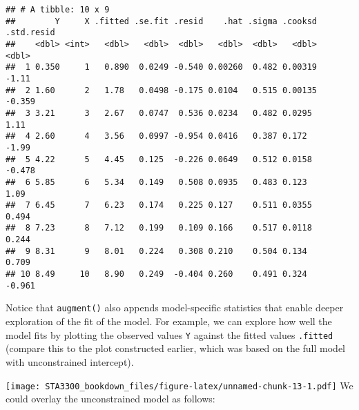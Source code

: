 \documentclass[
]{book}
\newenvironment{Shaded}{\begin{snugshade}}{\end{snugshade}}
\newcommand{\DataTypeTok}[1]{\textcolor[rgb]{0.13,0.29,0.53}{#1}}
\newcommand{\FloatTok}[1]{\textcolor[rgb]{0.00,0.00,0.81}{#1}}
\newcommand{\KeywordTok}[1]{\textcolor[rgb]{0.13,0.29,0.53}{\textbf{#1}}}
\newcommand{\NormalTok}[1]{#1}
\newcommand{\OperatorTok}[1]{\textcolor[rgb]{0.81,0.36,0.00}{\textbf{#1}}}
\newcommand{\StringTok}[1]{\textcolor[rgb]{0.31,0.60,0.02}{#1}}
\begin{document}
\begin{verbatim}
## # A tibble: 10 x 9
##        Y     X .fitted .se.fit .resid    .hat .sigma .cooksd .std.resid
##    <dbl> <int>   <dbl>   <dbl>  <dbl>   <dbl>  <dbl>   <dbl>      <dbl>
##  1 0.350     1   0.890  0.0249 -0.540 0.00260  0.482 0.00319     -1.11 
##  2 1.60      2   1.78   0.0498 -0.175 0.0104   0.515 0.00135     -0.359
##  3 3.21      3   2.67   0.0747  0.536 0.0234   0.482 0.0295       1.11 
##  4 2.60      4   3.56   0.0997 -0.954 0.0416   0.387 0.172       -1.99 
##  5 4.22      5   4.45   0.125  -0.226 0.0649   0.512 0.0158      -0.478
##  6 5.85      6   5.34   0.149   0.508 0.0935   0.483 0.123        1.09 
##  7 6.45      7   6.23   0.174   0.225 0.127    0.511 0.0355       0.494
##  8 7.23      8   7.12   0.199   0.109 0.166    0.517 0.0118       0.244
##  9 8.31      9   8.01   0.224   0.308 0.210    0.504 0.134        0.709
## 10 8.49     10   8.90   0.249  -0.404 0.260    0.491 0.324       -0.961
\end{verbatim}

Notice that \texttt{augment()} also appends model-specific statistics that enable deeper exploration of the fit of the model. For example, we can explore how well the model fits by plotting the observed values \texttt{Y} against the fitted values \texttt{.fitted} (compare this to the plot constructed earlier, which was based on the full model with unconstrained intercept).

\begin{Shaded}
\end{Shaded}

\texttt{[image: STA3300\_bookdown\_files/figure-latex/unnamed-chunk-13-1.pdf]}
We could overlay the unconstrained model as follows:
\end{document}

